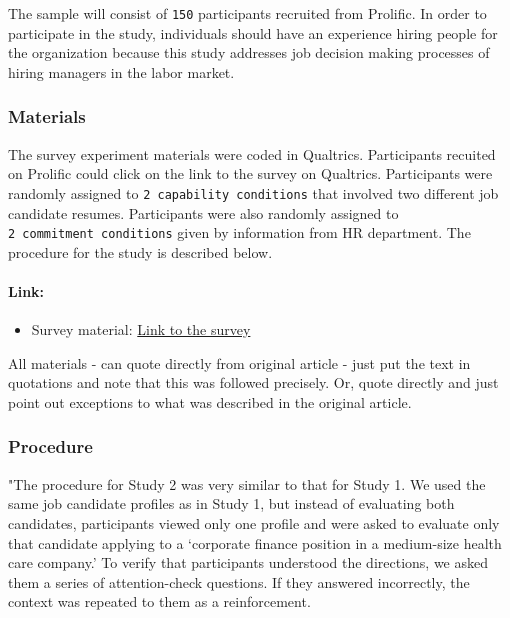 \documentclass[]{article}
\providecommand{\tightlist}{%
  \setlength{\itemsep}{0pt}\setlength{\parskip}{0pt}}
\let\oldparagraph\paragraph
\renewcommand{\paragraph}[1]{\oldparagraph{#1}\mbox{}}
\begin{document}
The sample will consist of \texttt{150} participants recruited from
Prolific. In order to participate in the study, individuals should have
an experience hiring people for the organization because this study
addresses job decision making processes of hiring managers in the labor
market.\\

\hypertarget{materials}{%
\subsubsection{Materials}\label{materials}}

The survey experiment materials were coded in Qualtrics. Participants
recuited on Prolific could click on the link to the survey on Qualtrics.
Participants were randomly assigned to
\texttt{2\ capability\ conditions} that involved two different job
candidate resumes. Participants were also randomly assigned to
\texttt{2\ commitment\ conditions} given by information from HR
department. The procedure for the study is described below.

\hypertarget{link}{%
\paragraph{Link:}\label{link}}

\begin{itemize}
\tightlist
\item
  Survey material:
  \href{https://stanforduniversity.qualtrics.com/jfe/preview/SV_3egYJH4CkorsKzk?Q_CHL=preview\&Q_SurveyVersionID=current}{Link
  to the survey}
\end{itemize}

All materials - can quote directly from original article - just put the
text in quotations and note that this was followed precisely. Or, quote
directly and just point out exceptions to what was described in the
original article.\\

\hypertarget{procedure}{%
\subsubsection{Procedure}\label{procedure}}

"The procedure for Study 2 was very similar to that for Study 1. We used
the same job candidate profiles as in Study 1, but instead of evaluating
both candidates, participants viewed only one profile and were asked to
evaluate only that candidate applying to a `corporate finance position
in a medium-size health care company.' To verify that participants
understood the directions, we asked them a series of attention-check
questions. If they answered incorrectly, the context was repeated to
them as a reinforcement.
\end{document}
